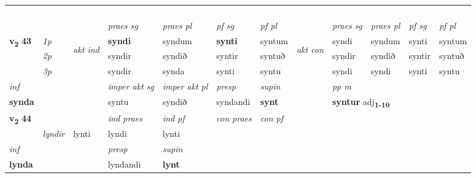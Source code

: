 \begin{longtable}[l]{X>{\footnotesize\itshape}llXXXXlXXXX}
\midrule
& \\*
  & \\*
   & \\*
  & \\
   \midrule
 & &   & \textit{praes sg}  & \textit{praes pl}    & \textit{ pf sg} & \textit{pf pl} & & \textit{praes sg}  & \textit{praes pl}    & \textit{pf sg} & \textit{pf pl }  \\ \cmidrule{4-7} \cmidrule{9-12}
 \multirow{2}{*}{{{\textbf{v{\textsubscript{2}}} \Large{\textbf{43}}}}}  & 1p & \multirow{3}{*}{\begin{turn}{90}\textit{akt ind}\end{turn}} & \textbf{syndi} & syndum & \textbf{synti} & syntum & \multirow{3}{*}{\begin{turn}{90}\textit{akt con}\end{turn}} &syndi & syndum & synti & syntum\\*
 & 2p &  &  syndir  & syndið & syntir & syntuð & & syndir & syndið & syntir & syntuð \\*
 & 3p &  & syndir & synda & synti & syntu & & syndi & syndi& synti & syntu \\*
\cmidrule{4-7} \cmidrule{9-12}

   {\textit{inf}} & &  & \textit{imper akt sg} & \textit{imper akt pl}   & \textit{presp} & \textit{supin}  && \textit{pp m} \\*
  {\textbf{synda}} & && syntu  & syndið   & syndandi &  \textbf{synt}  && \multicolumn{2}{l}{\textbf{syntur} adj\textbf{\textsubscript{1-10}}} \\*

\midrule

\multirow{2}{*}{{{\textbf{v{\textsubscript{2}}} \Large{\textbf{44}}}}}  &&&  \textit{ind praes} & \textit{ind pf} & \textit{con praes} & \textit{con pf} \\*
\multicolumn{3}{r}{\textit{e-m}} & lyndir & lynti & lyndi & lynti \\*

\cmidrule{4-7}
   {\textit{inf}} & &     & \textit{presp} & \textit{supin}   \\*
  {\textbf{lynda}} & &     & lyndandi &  \textbf{lynt}   \\*

\midrule


\end{longtable}
